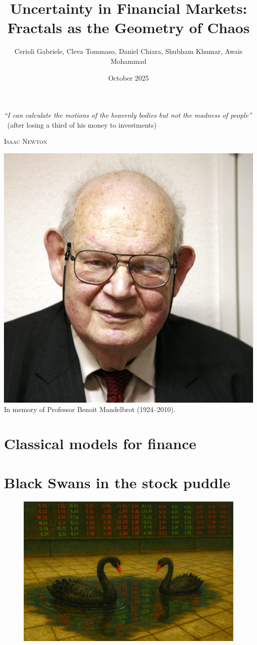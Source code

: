 \documentclass[english]{article}
\title{Uncertainty in Financial Markets: Fractals as the Geometry of Chaos}
\author{Cerioli Gabriele, Cleva Tommaso, Daniel Chiara, Shubham Khumar, Awais Mohammad}
\date{October 2025}
\begin{document}
\maketitle

\vspace{1cm}
\begin{center}
    \epigraph{\large\textit{“I can calculate the motions of the heavenly bodies but not the madness of people”}%
    \normalsize\ (after losing a third of his money to investments)}%
    {\large\scshape Isaac Newton}
\end{center}


\vfill
\begin{center}
    \includegraphics[width=0.35\linewidth]{img/mandelbrot.jpg}\\[0.3cm]
    \small In memory of Professor Benoit Mandelbrot (1924--2010).
\end{center}


\newpage
\tableofcontents

\newpage
\section{Classical models for finance}


\section{Black Swans in the stock puddle}

\begin{figure} [H]
    \centering
    \includegraphics[width=0.65\linewidth]{img/Copilot_20250925_235000.png}
\end{figure}

\end{document}
